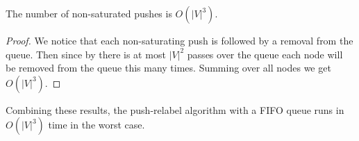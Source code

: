 \begin{theorem}
The number of non-saturated pushes is $O(|V|^3)$.
\end{theorem}

\begin{proof}
We notice that each non-saturating push is followed by a removal from the queue. Then since by  there is at most $|V|^2$ passes over the queue each node will be removed from the queue this many times. Summing over all nodes we get $O(|V|^3)$.
\end{proof}

Combining these results, the push-relabel algorithm with a FIFO queue runs in $O(|V|^3)$ time in the worst case.